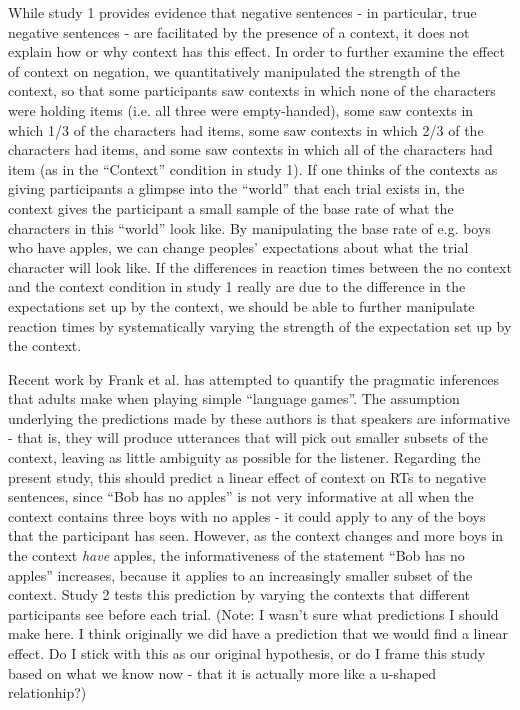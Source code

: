 \documentclass[man]{apa2}
\begin{document}
While study 1 provides evidence that negative sentences - in particular, true negative sentences - are facilitated by the presence of a context, it does not explain how or why context has this effect.  In order to further examine the effect of context on negation, we quantitatively manipulated the strength of the context, so that some participants saw contexts in which none of the characters were holding items (i.e. all three were empty-handed), some saw contexts in which 1/3 of the characters had items, some saw contexts in which 2/3 of the characters had items, and some saw contexts in which all of the characters had item (as in the ``Context'' condition in study 1).  If one thinks of the contexts as giving participants a glimpse into the ``world'' that each trial exists in, the context gives the participant a small sample of the base rate of what the characters in this ``world'' look like.  By manipulating the base rate of e.g. boys who have apples, we can change peoples' expectations about what the trial character will look like.  If the differences in reaction times between the no context and the context condition in study 1 really are due to the difference in the expectations set up by the context, we should be able to further manipulate reaction times by systematically varying the strength of the expectation set up by the context.  

Recent work by Frank et al. \cite{frank2009, frank2012} has attempted to quantify the pragmatic inferences that adults make when playing simple ``language games''. The assumption underlying the predictions made by these authors is that speakers are informative - that is, they will produce utterances that will pick out smaller subsets of the context, leaving as little ambiguity as possible for the listener.  Regarding the present study, this should predict a linear effect of context on RTs to negative sentences, since ``Bob has no apples'' is not very informative at all when the context contains three boys with no apples - it could apply to any of the boys that the participant has seen.  However, as the context changes and more boys in the context \emph{have} apples, the informativeness of the statement ``Bob has no apples'' increases, because it applies to an increasingly smaller subset of the context.  Study 2 tests this prediction by varying the contexts that different participants see before each trial.  (Note: I wasn't sure what predictions I should make here.  I think originally we did have a prediction that we would find a linear effect.  Do I stick with this as our original hypothesis, or do I frame this study based on what we know now - that it is actually more like a u-shaped relationhip?)
\end{document}
